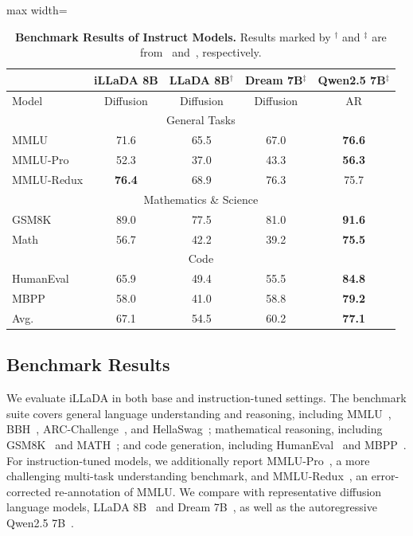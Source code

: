 \documentclass[]{bytedance_seed}
\begin{document}
\begin{table}[t!]
    \centering
    \caption{\textbf{Benchmark Results of Instruct Models.} Results marked by $^{\dagger}$ and $^{\ddagger}$ are from~\citet{nie2026large} and~\citet{ye2025dream}, respectively.}
    \label{tab:sft}
    \begin{adjustbox}{max width=\textwidth}
    \begin{tabular}{l|cccc}
      \toprule
          & iLLaDA 8B & LLaDA 8B$^{\dagger}$ & Dream 7B$^{\ddagger}$ & Qwen2.5 7B$^{\ddagger}$ \\
      \midrule
      Model & Diffusion & Diffusion & Diffusion & AR \\
      \midrule
      \multicolumn{5}{c}{General Tasks}\\
      \midrule
      MMLU & 71.6 & 65.5 & 67.0 & \textbf{76.6} \\
      MMLU-Pro & 52.3 & 37.0 & 43.3 & \textbf{56.3} \\
      MMLU-Redux & \textbf{76.4} & 68.9 & 76.3 & 75.7 \\
      \midrule
      \multicolumn{5}{c}{Mathematics \& Science}\\
      \midrule
      GSM8K & 89.0 & 77.5 & 81.0 & \textbf{91.6} \\
      Math & 56.7 & 42.2 & 39.2 & \textbf{75.5} \\
      \midrule
      \multicolumn{5}{c}{Code} \\
      \midrule
      HumanEval & 65.9 & 49.4 & 55.5 & \textbf{84.8} \\
      MBPP & 58.0 & 41.0 & 58.8 & \textbf{79.2} \\
      \midrule
      Avg. & 67.1 & 54.5 & 60.2 & \textbf{77.1} \\
      \bottomrule
    \end{tabular}
    \end{adjustbox}
    \vspace{-.2cm}
\end{table}

\subsection{Benchmark Results}
\label{sec:results}


We evaluate iLLaDA in both base and instruction-tuned settings. The benchmark suite covers general language understanding and reasoning, including MMLU~\citep{hendrycks2020measuring}, BBH~\citep{suzgun2022challenging}, ARC-Challenge~\citep{clark2018think}, and HellaSwag~\citep{zellers2019hellaswag}; mathematical reasoning, including GSM8K~\citep{cobbe2021training} and MATH~\citep{hendrycks2021measuring}; and code generation, including HumanEval~\citep{chen2021evaluating} and MBPP~\citep{austin2021program}. For instruction-tuned models, we additionally report MMLU-Pro~\citep{wang2024mmlupro}, a more challenging multi-task understanding benchmark, and MMLU-Redux~\citep{gema2024done}, an error-corrected re-annotation of MMLU. We compare with representative diffusion language models, LLaDA 8B~\citep{nie2026large} and Dream 7B~\citep{ye2025dream}, as well as the autoregressive Qwen2.5 7B~\citep{qwen2.5}.
\end{document}
